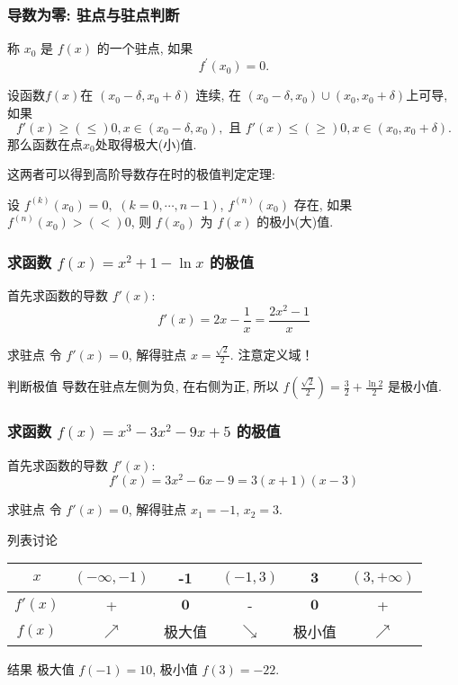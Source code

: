\documentclass[
10pt,
aspectratio=43,
]{beamer}
\begin{document}
\begin{frame}
	\frametitle{导数为零: 驻点与驻点判断}
	\begin{block}{}
		称 $x_0$ 是 $f(x)$ 的一个驻点, 如果
		$$
			f^{\prime}\left(x_0\right)=0.
		$$
	\end{block}
	\begin{block}{}
		设函数$f(x)$在 $(x_0-\delta,x_0+\delta)$ 连续, 在 $(x_0-\delta,x_0)\cup(x_0,x_0+\delta)$上可导, 如果
		$$
			f'(x)\ge(\le)0, x\in(x_0-\delta,x_0),\,\,\text{且} \,\,f'(x)\le(\ge)0, x\in(x_0,x_0+\delta).
		$$
		那么函数在点$x_0$处取得极大(小)值.
	\end{block}
	这两者可以得到高阶导数存在时的极值判定定理:
	\begin{exampleblock}{}
		设 $f^{(k)}(x_0)=0,\,\,(k=0,\cdots,n-1)$, $f^{(n)}(x_0)$ 存在, 如果 $f^{(n)}(x_0)>(<)0$, 则 $f(x_0)$ 为 $f(x)$ 的极小(大)值.
	\end{exampleblock}
\end{frame}


\begin{frame}
	\frametitle{求函数 $f(x)=x^2+1-\ln x$ 的极值}
	\everymath{\displaystyle}
	\begin{block}{}
		首先求函数的导数 $f'(x)$:
		\[ f'(x) = 2x - \frac{1}{x} = \frac{2x^2 - 1}{x} \]
	\end{block}
	\pause
	\begin{block}{求驻点}
		令 $f'(x) = 0$, 解得驻点 $x = \frac{\sqrt{2}}{2}$. 注意定义域！
	\end{block}
	\pause
	\begin{block}{判断极值}
		导数在驻点左侧为负, 在右侧为正, 所以 $f\left(\frac{\sqrt{2}}{2}\right) = \frac{3}{2} + \frac{\ln 2}{2}$ 是极小值.
	\end{block}
\end{frame}

\begin{frame}
	\frametitle{求函数 $f(x)=x^3-3 x^2-9 x+5$ 的极值}
	\everymath{\displaystyle}
	\begin{block}{}
		首先求函数的导数 $f'(x)$:
		\[ f'(x) = 3x^2 - 6x - 9 = 3(x+1)(x-3) \]
	\end{block}
	\pause
	\begin{block}{求驻点}
		令 $f'(x) = 0$, 解得驻点 $x_1 = -1$, $x_2 = 3$.
	\end{block}
	\pause
	\begin{block}{列表讨论}
		\begin{tabular}{|c|c|c|c|c|c|}
			\hline
			$x$     & $(-\infty,-1)$ & -1           & $(-1,3)$   & $\mathbf{3}$ & $(3,+\infty)$ \\
			\hline
			$f'(x)$ & +              & $\mathbf{0}$ & -          & $\mathbf{0}$ & +             \\
			\hline
			$f(x)$  & $\nearrow$     & 极大值          & $\searrow$ & 极小值          & $\nearrow$    \\
			\hline
		\end{tabular}
	\end{block}
	\pause
	\begin{block}{结果}
		极大值 $f(-1) = 10$, 极小值 $f(3) = -22$.
	\end{block}
\end{frame}
\end{document}
